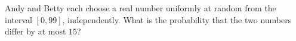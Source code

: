 Andy and Betty each choose a real number uniformly at random from the interval $[0,99]$, independently. What is the probability that the two numbers differ by at most $15$?
